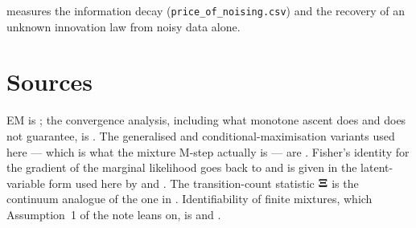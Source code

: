 \begin{codebox}
 measures the information decay
(\texttt{price\_of\_noising.csv}) and the recovery of an unknown innovation law from noisy data
alone.
\end{codebox}

\section*{Sources}
EM is \citet{dempster1977maximum}; the convergence analysis, including what monotone ascent does and
does not guarantee, is \citet{wu1983}. The generalised and conditional-maximisation variants
used here --- which is what the mixture M-step actually is --- are \citet{meng1993maximum}. Fisher's
identity for the gradient of the marginal likelihood goes back to \citet{fisher1925} and is
given in the latent-variable form used here by \citet{louis1982} and \citet{cappe2005}. The
transition-count statistic $\mathbf{\Xi}$ is the continuum analogue of the one in \citet{baum1970}.
Identifiability of finite mixtures, which Assumption~1 of the note leans on, is
\citet{teicher1963} and \citet{yakowitz1968}.
